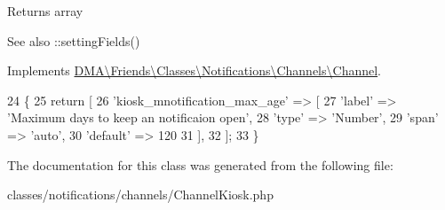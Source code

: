 \begin{DoxyReturn}{Returns}
array
\end{DoxyReturn}
 \begin{DoxySeeAlso}{See also}
\+::setting\+Fields() 
\end{DoxySeeAlso}


Implements \hyperlink{interfaceDMA_1_1Friends_1_1Classes_1_1Notifications_1_1Channels_1_1Channel_aa473115fa58a6fa5f57a9069f23dd771}{D\+M\+A\textbackslash{}\+Friends\textbackslash{}\+Classes\textbackslash{}\+Notifications\textbackslash{}\+Channels\textbackslash{}\+Channel}.


\begin{DoxyCode}
24     \{
25         \textcolor{keywordflow}{return} [
26             \textcolor{stringliteral}{'kiosk\_mnotification\_max\_age'} => [
27                 \textcolor{stringliteral}{'label'} => \textcolor{stringliteral}{'Maximum days to keep an notificaion open'},
28                 \textcolor{stringliteral}{'type'}  => \textcolor{stringliteral}{'Number'},
29                 \textcolor{stringliteral}{'span'}  => \textcolor{stringliteral}{'auto'},
30                 \textcolor{stringliteral}{'default'} => 120
31             ],
32         ];
33     \}
\end{DoxyCode}


The documentation for this class was generated from the following file\+:\begin{DoxyCompactItemize}
\item 
classes/notifications/channels/Channel\+Kiosk.\+php\end{DoxyCompactItemize}
